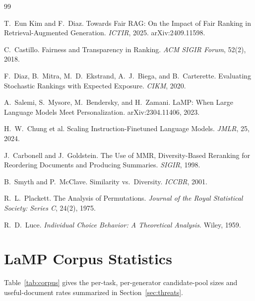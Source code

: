 \documentclass[10pt,twocolumn]{article}
\begin{document}
\newpage
{\footnotesize
\begin{thebibliography}{99}

T.\ Eun Kim and F.\ Diaz.
\newblock Towards Fair RAG: On the Impact of Fair Ranking in Retrieval-Augmented
Generation.
\newblock \emph{ICTIR}, 2025. arXiv:2409.11598.

C.\ Castillo.
\newblock Fairness and Transparency in Ranking.
\newblock \emph{ACM SIGIR Forum}, 52(2), 2018.

F.\ Diaz, B.\ Mitra, M.\ D.\ Ekstrand, A.\ J.\ Biega, and B.\ Carterette.
\newblock Evaluating Stochastic Rankings with Expected Exposure.
\newblock \emph{CIKM}, 2020.

A.\ Salemi, S.\ Mysore, M.\ Bendersky, and H.\ Zamani.
\newblock LaMP: When Large Language Models Meet Personalization.
\newblock arXiv:2304.11406, 2023.

H.\ W.\ Chung et al.
\newblock Scaling Instruction-Finetuned Language Models.
\newblock \emph{JMLR}, 25, 2024.

J.\ Carbonell and J.\ Goldstein.
\newblock The Use of MMR, Diversity-Based Reranking for Reordering Documents and
Producing Summaries.
\newblock \emph{SIGIR}, 1998.

B.\ Smyth and P.\ McClave.
\newblock Similarity vs.\ Diversity.
\newblock \emph{ICCBR}, 2001.

R.\ L.\ Plackett.
\newblock The Analysis of Permutations.
\newblock \emph{Journal of the Royal Statistical Society: Series C}, 24(2), 1975.

R.\ D.\ Luce.
\newblock \emph{Individual Choice Behavior: A Theoretical Analysis}.
\newblock Wiley, 1959.

\end{thebibliography}
}

\clearpage
\appendix
\section{LaMP Corpus Statistics}
\label{app:corpus}

Table~\ref{tab:corpus} gives the per-task, per-generator candidate-pool sizes and
useful-document rates summarized in Section~\ref{sec:threats}.
\end{document}
